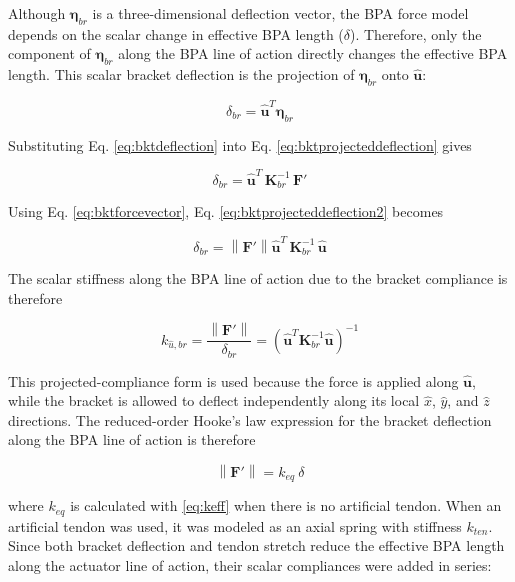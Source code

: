 Although $\boldsymbol{\eta}_{br}$ is a three-dimensional deflection vector, the BPA force model depends on the scalar change in effective BPA length ($\delta$). Therefore, only the component of $\boldsymbol{\eta}_{br}$ along the BPA line of action directly changes the effective BPA length. This scalar bracket deflection is the projection of $\boldsymbol{\eta}_{br}$ onto $\hat{\mathbf{u}}$:

\begin{equation}
{\delta}_{br} = \hat{\mathbf{u}}^{T} \boldsymbol{\eta}_{br}
\label{eq:bktprojecteddeflection}
\end{equation}

Substituting Eq. \ref{eq:bktdeflection} into Eq. \ref{eq:bktprojecteddeflection} gives

\begin{equation}
{\delta}_{br} = \hat{\mathbf{u}}^{T} \, \mathbf{K}_{br}^{-1} \, \mathbf{F}'
\label{eq:bktprojecteddeflection2}
\end{equation}

Using Eq. \ref{eq:bktforcevector}, Eq. \ref{eq:bktprojecteddeflection2} becomes

\begin{equation}
\delta_{br} = \left\| \mathbf{F}' \right\| \hat{\mathbf{u}}^{T} \, \mathbf{K}_{br}^{-1} \, \hat{\mathbf{u}}
\label{eq:bktprojectedcompliance}
\end{equation}

The scalar stiffness along the BPA line of action due to the bracket compliance is therefore

\begin{equation}
k_{\hat{u},br} = \frac{\left\| \mathbf{F}' \right\|}{\delta_{br}} = \left( \hat{\mathbf{u}}^{T} \mathbf{K}_{br}^{-1} \hat{\mathbf{u}} \right)^{-1}
\label{eq:keff}
\end{equation}

This projected-compliance form is used because the force is applied along $\hat{\mathbf{u}}$, while the bracket is allowed to deflect independently along its local $\hat{x}$, $\hat{y}$, and $\hat{z}$ directions. The reduced-order Hooke's law expression for the bracket deflection along the BPA line of action is therefore

\begin{equation} \left\| \mathbf{F}' \right\| = k_{eq} \: \delta
\label{eq:hookereduced}
\end{equation}

where $k_{eq}$ is calculated with \eqref{eq:keff} when there is no artificial tendon. When an artificial tendon was used, it was modeled as an axial spring with stiffness $k_{ten}$. Since both bracket deflection and tendon stretch reduce the effective BPA length along the actuator line of action, their scalar compliances were added in series:

